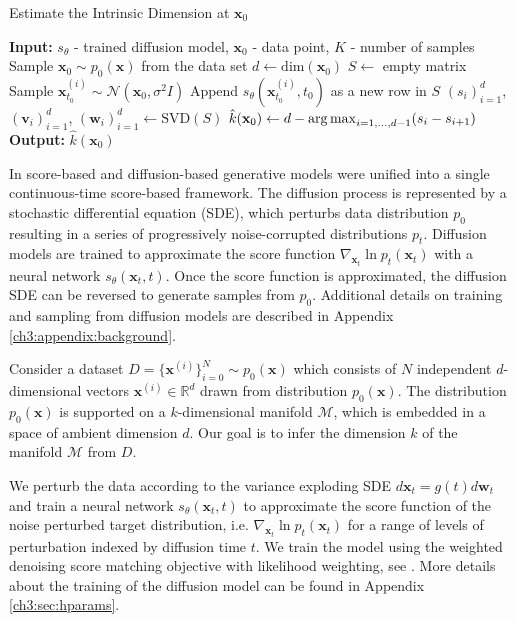 \begin{algorithm}
    \caption{Estimate the Intrinsic Dimension at $\mathbf{x}_0$}
    \label{ch3:alg:intrinsic_dimension}
    \begin{algorithmic}[1]
        \STATE \textbf{Input:} $s_\theta$ - trained diffusion model, $\mathbf{x}_0$ - data point, $K$ - number of samples
        \STATE Sample $\mathbf{x}_0 \sim p_0(\mathbf{x})$ from the data set
        \STATE $d \gets \text{dim}(\mathbf{x}_0)$
        \STATE $S \gets$ empty matrix
            \STATE Sample $\mathbf{x}_{t_0}^{(i)} \sim \mathcal{N}(\mathbf{x}_0, \sigma^2 I)$
            \STATE Append $s_{\theta}(\mathbf{x}_{t_0}^{(i)}, t_0)$ as a new row in $S$
        \ENDFOR
        \STATE $(s_i)_{i=1}^d$, $(\mathbf{v}_i)_{i=1}^d$, $(\mathbf{w}_i)_{i=1}^d \gets \text{SVD}(S)$
        \STATE $\hat{k}(\mathbf{x}_0) \gets d - \operatorname*{arg\,max}_{i=1,\dots,d-1} (s_i - s_{i+1})$
        \STATE \textbf{Output:} $\hat{k}(\mathbf{x}_0)$
    \end{algorithmic}
\end{algorithm}
    

In \cite{song2020score} score-based  \cite{score_matching} and diffusion-based \cite{diffusion_models, ddpm} generative models were unified into a single continuous-time score-based framework. The diffusion process is represented by a stochastic differential equation (SDE), which perturbs data distribution $p_0$  resulting in a series of progressively noise-corrupted distributions  $p_t$.  Diffusion models are trained to approximate the score function $\nabla_{\textbf{x}_t}{\ln{p_t(\textbf{x}_t)}}$ with a neural network $s_\theta(\textbf{x}_t,t)$. Once the score function is approximated, the diffusion SDE can be reversed to generate samples from $p_0$. Additional details on training and sampling from diffusion models are described in Appendix \ref{ch3:appendix:background}.
 
Consider a dataset $D=\{\textbf{x}^{(i)}\}_{i=0}^N\sim p_0(\textbf{x})$ which consists of $N$ independent $d$-dimensional vectors $\textbf{x}^{(i)} \in \mathbb{R}^d$ drawn from distribution $p_0(\textbf{x})$. The distribution $p_0(\textbf{x})$ is supported on a $k$-dimensional manifold $\mathcal{M}$, which is embedded in a space of ambient dimension $d$. Our goal is to infer the dimension $k$ of the manifold $\mathcal{M}$ from $D$.

We perturb the data according to the variance exploding SDE \(d\textbf{x}_t = g(t)d\textbf{w}_t\)  \cite{song2020score} and train a neural network $s_{\theta}(\textbf{x}_t,t)$ to approximate the score function of the noise perturbed target distribution, i.e. $\nabla_{\textbf{x}_t}{\ln{p_t(\textbf{x}_t)}}$ for a range of levels of perturbation indexed by diffusion time $t$. We train the model using the weighted denoising score matching objective with likelihood weighting, see \cite{song2021maximum}. More details about the training of the diffusion model can be found in Appendix \ref{ch3:sec:hparams}.

